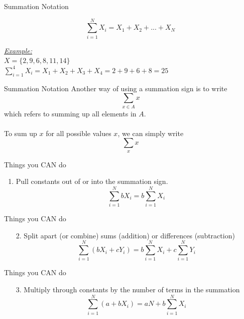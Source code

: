 \documentclass{./../div_teaching_slides}
\begin{document}
\begin{frame}
\vfill
\centering
\Large {}
\vfill

\end{frame}

\begin{frame}[t]{Summation Notation}

$$ \sum_{i=1}^N X_i = X_1 + X_2 + ... + X_N $$

\vspace{1em}
\underline{\textit{Example:}} \\
\vspace{0.5em}
$X = \{2,9,6,8,11,14\}$ \\
\vspace{1em}
$\sum_{i=1}^{4} X_i = X_1 + X_2 + X_3 + X_4 = 2+9+6+8=25$ 
\end{frame}

\begin{frame}{Summation Notation}
Another way of using a summation sign is to write $$\sum_{x \in A} x $$
which refers to summing up all elements in $A$. \\~\\
To sum up $x$ for all possible values $x$, we can simply write $$\sum_x x$$
\end{frame}


\begin{frame}{Things you CAN do}
\begin{enumerate}
\item Pull constants out of or into the summation sign.
$$ \sum_{i=1}^N b X_i = b \sum_{i=1}^N X_i  $$
\end{enumerate}
\end{frame}

\begin{frame}{Things you CAN do}
\begin{enumerate}
\item[2.] Split apart (or combine) sums (addition) or differences (subtraction)
$$ \sum_{i=1}^N (b X_i + c Y_i) = b \sum_{i=1}^N X_i  + c \sum_{i=1}^N Y_i $$
\end{enumerate}
\end{frame}

\begin{frame}{Things you CAN do}
\begin{enumerate}
\item[3.] Multiply through constants by the number of terms in the summation
$$ \sum_{i=1}^N (a+b X_i)= aN + b \sum_{i=1}^N X_i  $$
\end{enumerate}
\end{frame}
\end{document}
